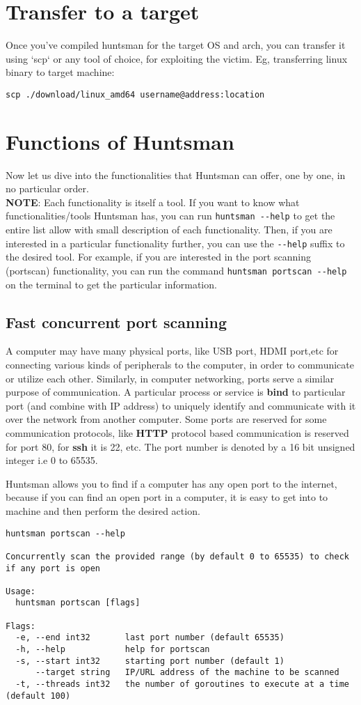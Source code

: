 \documentclass[12pt]{article}
\begin{document}
		\section{Transfer to a target}
Once you've compiled huntsman for the target OS and arch, you can transfer it 
using `scp` or any tool of choice, for exploiting the victim.  
Eg, transferring linux binary to target machine:  
\begin{verbatim}
scp ./download/linux_amd64 username@address:location
\end{verbatim}

\section{Functions of Huntsman}
Now let us dive into the functionalities that Huntsman can offer, one by one, in no particular order.\\
\textbf{NOTE}: Each functionality is itself a tool. If you want to know what functionalities/tools Huntsman has, you can run \verb|huntsman --help| to get the entire list allow with small description of each functionality. Then, if you are interested in a particular functionality further, you can use the \verb|--help| suffix to the desired tool. For example, if you are interested in the port scanning (portscan) functionality, you can run the command \verb|huntsman portscan --help| on the terminal to get the particular information.  

\subsection{Fast concurrent port scanning}
A computer may have many physical ports, like USB port, HDMI port,etc for connecting various kinds of peripherals to the computer, in order to communicate or utilize each other. Similarly, in computer networking, ports serve a similar purpose of communication. A particular process or service is \textbf{bind} to particular port (and combine with IP address) to uniquely identify and communicate with it over the network from another computer. Some ports are reserved for some communication protocols, like \textbf{HTTP} protocol based communication is reserved for port 80, for \textbf{ssh} it is 22, etc. The port number is denoted by a 16 bit unsigned integer i.e 0 to 65535.

Huntsman allows you to find if a computer has any open port to the internet, because if you can find an open port in a computer, it is easy to get into to machine and then perform the desired action. 
\begin{verbatim}
huntsman portscan --help

Concurrently scan the provided range (by default 0 to 65535) to check if any port is open

Usage:
  huntsman portscan [flags]

Flags:
  -e, --end int32       last port number (default 65535)
  -h, --help            help for portscan
  -s, --start int32     starting port number (default 1)
      --target string   IP/URL address of the machine to be scanned
  -t, --threads int32   the number of goroutines to execute at a time (default 100)
\end{verbatim}
\end{document}
